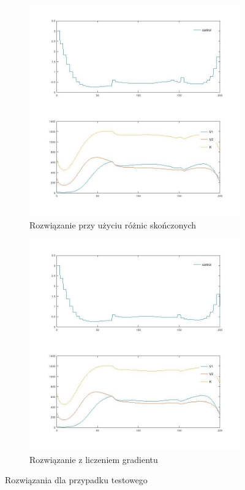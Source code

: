 \documentclass[11pt]{article}
\begin{document}
\begin{figure}[h]
  \begin{subfigure}{.5\textwidth}
    \caption{Rozwiązanie przy użyciu różnic skończonych}\label{nograd_sol}
    \includegraphics[width=\textwidth]{../plots/plot_nograd}
  \end{subfigure}
  \begin{subfigure}{.5\textwidth}
    \caption{Rozwiązanie z liczeniem gradientu}\label{test_sol}
    \includegraphics[width=\textwidth]{../plots/plot_test}
  \end{subfigure}%
  \caption{Rozwiązania dla przypadku testowego}\label{test_nograd_sol}
\end{figure}
\end{document}
